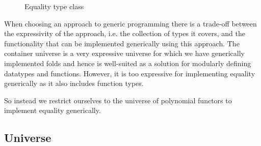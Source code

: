 \begin{figure}[t]
\caption{Equality type class}
\label{fig:equalityclass}
\end{figure}


When choosing an approach to generic programming there is a trade-off
between the expressivity of the approach, i.e. the collection of types
it covers, and the functionality that can be implemented generically
using this approach. The container universe is a very expressive
universe for which we have generically implemented folds and hence is
well-suited as a solution for modularly defining datatypes and
functions. However, it is too expressive for implementing equality
generically as it also includes function types.

So instead we restrict ourselves to the universe of polynomial
functors to implement equality generically. 

\subsection{Universe}

